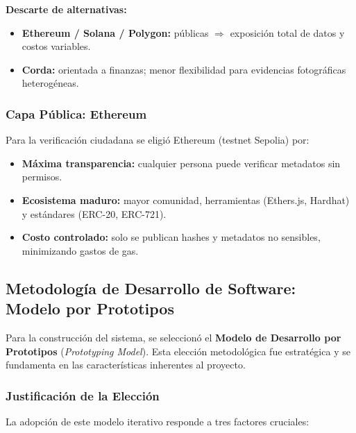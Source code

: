 \textbf{Descarte de alternativas:}
\begin{itemize}
    \item \textbf{Ethereum / Solana / Polygon:} públicas $\Rightarrow$ exposición total de datos y costos variables.
    \item \textbf{Corda:} orientada a finanzas; menor flexibilidad para evidencias fotográficas heterogéneas.
\end{itemize}

\subsubsection{Capa Pública: Ethereum}

Para la verificación ciudadana se eligió Ethereum (testnet Sepolia) por:

\begin{itemize}
    \item \textbf{Máxima transparencia:} cualquier persona puede verificar metadatos sin permisos.
    
    \item \textbf{Ecosistema maduro:} mayor comunidad, herramientas (Ethers.js, Hardhat) y estándares (ERC-20, ERC-721).
    
    \item \textbf{Costo controlado:} solo se publican hashes y metadatos no sensibles, minimizando gastos de gas.
\end{itemize}

\subsection{Metodología de Desarrollo de Software: Modelo por Prototipos}

Para la construcción del sistema, se seleccionó el \textbf{Modelo de Desarrollo por Prototipos} (\textit{Prototyping Model}). Esta elección metodológica fue estratégica y se fundamenta en las características inherentes al proyecto.

\subsubsection{Justificación de la Elección}

La adopción de este modelo iterativo responde a tres factores cruciales:

